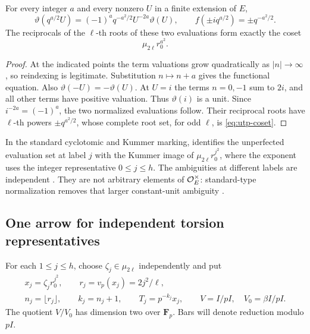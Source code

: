 \begin{lemma}\label{lem:utp-evaluation}
For every integer $a$ and every nonzero $U$ in a finite extension
of $E$,
\[
 \vartheta(q^{a/2}U)
   =(-1)^a q^{-a^2/2}U^{-2a}\vartheta(U),
 \qquad
 f(\pm i q^{a/2})=\pm q^{-a^2/2}.
\]
The reciprocals of the $\ell$-th roots of these two evaluations
form exactly the coset
\begin{equation}\label{eq:utp-coset}
                         \mu_{2\ell}r_0^{a^2}.
\end{equation}
\end{lemma}
\begin{proof}
At the indicated points the term valuations grow quadratically
as $|n|\to\infty$, so reindexing is legitimate. Substitution
$n\mapsto n+a$ gives the functional equation. Also
$\vartheta(-U)=-\vartheta(U)$. At $U=i$ the terms $n=0,-1$
sum to $2i$, and all other terms have positive valuation.
Thus $\vartheta(i)$ is a unit. Since $i^{-2a}=(-1)^a$,
the two normalized evaluations follow. Their reciprocal roots
have $\ell$-th powers $\pm q^{a^2/2}$, whose complete root set,
for odd $\ell$, is \eqref{eq:utp-coset}.
\end{proof}

In the standard cyclotomic and Kummer marking,
\cite[Remark~2.5.1(i), p.~72]{IUT2} identifies the unperfected
evaluation set at label $j$ with the Kummer image of
$\mu_{2\ell}r_0^{j^2}$, where the exponent uses the integer
representative $0\le j\le h$. The ambiguities at different
labels are independent \cite[Remark~2.5.1(iii), p.~73]{IUT2}.
They are not arbitrary elements of $\mathcal O_E^\times$:
standard-type normalization removes that larger constant-unit
ambiguity \cite[Remark~1.12.2(i),(ii)]{IUT2}.

\subsection{One arrow for independent torsion representatives}

For each $1\le j\le h$, choose $\zeta_j\in\mu_{2\ell}$
independently and put
\begin{equation}\label{eq:utp-inputs}
 \begin{gathered}
 x_j=\zeta_j r_0^{j^2},\qquad r_j=v_p(x_j)=2j^2/\ell,\\
 n_j=\lfloor r_j\rfloor,\qquad k_j=n_j+1,\qquad
 T_j=p^{-k_j}x_j,\qquad
 V=I/pI,\quad V_0=\beta I/pI .
 \end{gathered}
\end{equation}
The quotient $V/V_0$ has dimension two over $\mathbf F_p$.
Bars will denote reduction modulo $pI$.

